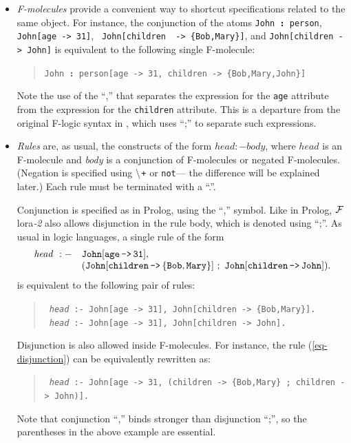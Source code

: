 \documentclass[11pt]{article}
\newcommand{\isa}{\,{\bf{:}}\,}
\newcommand{\mvd}{{\mbox{\tt \,->\,}}}  %
\newcommand{\FLORA}{{\mbox{\sc ${\cal F}${lora}\rm\emph{-2}}}\xspace}
\newcommand{\fl}{\mbox{F-logic}\xspace}
\newcommand{\NAF}{\mbox{\tt \ensuremath{\tt\backslash}+}\xspace}
\newcommand{\TNOT}{{{\tt not}}\xspace}
\begin{document}
\begin{itemize}
\item
  \emph{F-molecules} provide a convenient way to shortcut specifications
  related to the same object. For instance, the conjunction of the atoms
  {\tt John{\isa}person}, {\tt John[age{\mvd}31]}, {\tt
  John[children \mvd \{Bob,Mary\}]}, and {\tt John[children\mvd John]}
  is equivalent to the following single F-molecule:
  \begin{quote}
    {\tt John{\isa}person[age{\mvd}31, children\mvd\{Bob,Mary,John\}]} 
  \end{quote}
  Note the use of the ``,'' that separates the expression for the {\tt age}
  attribute from the expression for the {\tt children} attribute. This is a
  departure from the original \fl syntax in \cite{KLW95}, which uses ``;'' 
  to separate such expressions.
  
\item \emph{Rules} are, as usual, the constructs of the form $head :-
  body$, where $head$ is an F-molecule and \emph{body} is a conjunction of
  F-molecules or negated F-molecules. (Negation is specified using {\NAF}
    or \TNOT --- the difference will be explained later.)
  Each rule must be terminated with a ``.''.
  
  Conjunction is specified as in Prolog, using the ``,'' symbol. Like in
  Prolog, \FLORA also allows disjunction in the rule body, which is denoted
  using ``;''. As usual in logic languages, a single rule of the form
  \begin{equation}\label{eq-disjunction}
    \begin{array}{rl}
    {\it head}~:- & \tt John[age{\mvd}31],\\
                  & \tt (John[children\mvd\{Bob,Mary\}]~;~ John[children\mvd John]).
    \end{array}
  \end{equation}
  is equivalent to the following pair of rules:
  \begin{quote}
  {\tt
    {\it head}~:-~John[age{\mvd}31],~John[children\mvd\{Bob,Mary\}].
    }
  \\
  {\tt
    {\it head}~:-~John[age{\mvd}31],~John[children\mvd John].
    }
  \end{quote}
  Disjunction is also allowed inside F-molecules. For instance, the rule
  (\ref{eq-disjunction}) can be equivalently rewritten as:
  \begin{quote}
 {\tt
   {\it head}~:-~John[age{\mvd}31,~(children\mvd\{Bob,Mary\}~;~children\mvd John)].
   }
  \end{quote}
  Note that conjunction ``,'' binds stronger than disjunction ``;'', so the
  parentheses in the above example are essential.
  

\end{itemize}
\end{document}
